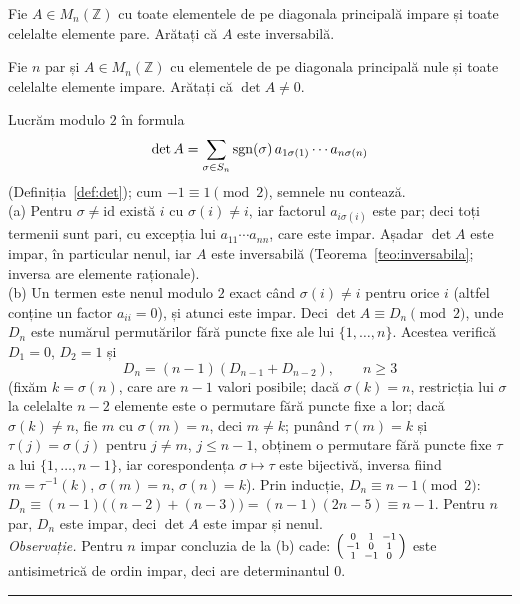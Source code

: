 \begin{parti}
  \item Fie $A\in M_n(\mathbb{Z})$ cu toate elementele de pe diagonala principală impare și toate celelalte elemente pare. Arătați că $A$ este inversabilă.
  \item Fie $n$ par și $A\in M_n(\mathbb{Z})$ cu elementele de pe diagonala principală nule și toate celelalte elemente impare. Arătați că $\det A\neq0$.
\end{parti}
\sol Lucrăm modulo $2$ în formula
\[ \det A=\sum_{\sigma\in S_n}\operatorname{sgn}(\sigma)\,a_{1\sigma(1)}\cdots a_{n\sigma(n)} \]
(Definiția~\ref{def:det}); cum $-1\equiv1\pmod 2$, semnele nu contează.\\[2pt]
(a) Pentru $\sigma\neq\mathrm{id}$ există $i$ cu $\sigma(i)\neq i$, iar factorul $a_{i\sigma(i)}$ este par; deci toți termenii sunt pari, cu excepția lui $a_{11}\cdots a_{nn}$, care este impar. Așadar $\det A$ este impar, în particular nenul, iar $A$ este inversabilă (Teorema~\ref{teo:inversabila}; inversa are elemente raționale).\\[2pt]
(b) Un termen este nenul modulo $2$ exact când $\sigma(i)\neq i$ pentru orice $i$ (altfel conține un factor $a_{ii}=0$), și atunci este impar. Deci $\det A\equiv D_n\pmod2$, unde $D_n$ este numărul permutărilor fără puncte fixe ale lui $\{1,\dots,n\}$. Acestea verifică $D_1=0$, $D_2=1$ și
\[ D_n=(n-1)(D_{n-1}+D_{n-2}),\qquad n\ge3 \]
(fixăm $k=\sigma(n)$, care are $n-1$ valori posibile; dacă $\sigma(k)=n$, restricția lui $\sigma$ la celelalte $n-2$ elemente este o permutare fără puncte fixe a lor; dacă $\sigma(k)\neq n$, fie $m$ cu $\sigma(m)=n$, deci $m\neq k$; punând $\tau(m)=k$ și $\tau(j)=\sigma(j)$ pentru $j\neq m$, $j\le n-1$, obținem o permutare fără puncte fixe $\tau$ a lui $\{1,\dots,n-1\}$, iar corespondența $\sigma\mapsto\tau$ este bijectivă, inversa fiind $m=\tau^{-1}(k)$, $\sigma(m)=n$, $\sigma(n)=k$). Prin inducție, $D_n\equiv n-1\pmod2$: $D_n\equiv(n-1)\bigl((n-2)+(n-3)\bigr)=(n-1)(2n-5)\equiv n-1$. Pentru $n$ par, $D_n$ este impar, deci $\det A$ este impar și nenul.\\[2pt]
\emph{Observație.} Pentru $n$ impar concluzia de la (b) cade: $\begin{psmallmatrix}0&1&-1\\-1&0&1\\1&-1&0\end{psmallmatrix}$ este antisimetrică de ordin impar, deci are determinantul $0$.
\vspace{1mm}\hrule

